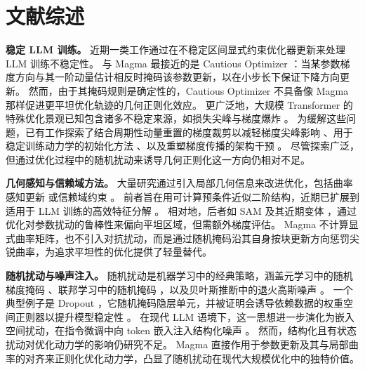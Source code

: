 \documentclass[11pt, a4paper, twocolumn, copyright, goog]{google}
\theoremstyle{plain}
\theoremstyle{definition}
\theoremstyle{remark}
\begin{document}
\section{文献综述}
\textbf{稳定 LLM 训练。}
近期一类工作通过在不稳定区间显式约束优化器更新来处理 LLM 训练不稳定性。
与 Magma 最接近的是 Cautious Optimizer \citep{liang2024cautious}：当某参数梯度方向与其一阶动量估计相反时掩码该参数更新，以在小步长下保证下降方向更新。
然而，由于其掩码规则是确定性的，Cautious Optimizer 不具备像 Magma 那样促进更平坦优化轨迹的几何正则化效应。
更广泛地，大规模 Transformer 的特殊优化景观已知包含诸多不稳定来源，如损失尖峰与梯度爆炸 \citep{chowdhery2023palm}。
为缓解这些问题，已有工作探索了结合周期性动量重置的梯度裁剪以减轻梯度尖峰影响 \citep{huang2025spam}、用于稳定训练动力学的初始化方法 \citep{nguyen2019transformers,takase2023spike}、以及重塑梯度传播的架构干预 \citep{dettmers20218,xiong2020layer,wang2024deepnet}。
尽管探索广泛，但通过优化过程中的随机扰动来诱导几何正则化这一方向仍相对不足。


\textbf{几何感知与信赖域方法。}
大量研究通过引入局部几何信息来改进优化，包括曲率感知更新 \citep{dauphin2014identifying, martens2015optimizing, gupta2018shampoo,  yao2021adaHessian} 或信赖域约束 \citep{foret2020sharpness,kwon2021asam}。 
前者旨在用可计算预条件近似二阶结构，近期已扩展到适用于 LLM 训练的高效特征分解 \citep{vyas2024soap}。 
相对地，后者如 SAM 及其近期变体 \citep{mueller2023normalization,li2024friendly}，通过优化对参数扰动的鲁棒性来偏向平坦区域，但需额外梯度评估。 
Magma 不计算显式曲率矩阵，也不引入对抗扰动，而是通过随机掩码沿其自身按块更新方向惩罚尖锐曲率，为追求平坦性的优化提供了轻量替代。



\textbf{随机扰动与噪声注入。}
随机扰动是机器学习中的经典策略，涵盖元学习中的随机梯度掩码 \citep{tseng2020regularizing}、联邦学习中的随机掩码 \citep{wei2020framework}，以及贝叶斯推断中的退火高斯噪声 \citep{welling2011bayesian, neelakantan2015adding}。 
一个典型例子是 Dropout \citep{srivastava2014dropout}，它随机掩码隐层单元，并被证明会诱导依赖数据的权重空间正则器以提升模型稳定性 \citep{mianjy2018implicit,wei2020implicit,zhang2024implicit}。
在现代 LLM 语境下，这一思想进一步演化为嵌入空间扰动，在指令微调中向 token 嵌入注入结构化噪声 \citep{jain2024neftune}。 
然而，结构化且有状态扰动对优化动力学的影响仍研究不足。 
Magma 直接作用于参数更新及其与局部曲率的对齐来正则化优化动力学，凸显了随机扰动在现代大规模优化中的独特价值。





\end{document}
